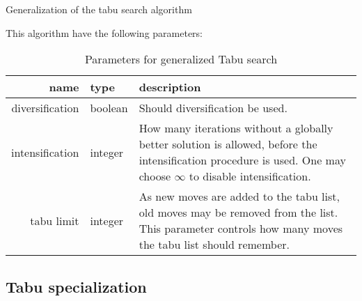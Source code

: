 \begin{algorithm}[H]
  \caption{Generalization of the tabu search algorithm}
  \begin{algorithmic}[1]
     
     
     
    \State
    \Repeat
         
            \State {}
        \Else
                 
            \EndIf
             
        \EndIf
        
        \EndIf
    \State {}
    \EndFunction
  \end{algorithmic}
\end{algorithm}

This algorithm have the following parameters:

\begin{table}[H]
\centering
\begin{tabular}{r|p{2cm}|p{6cm}}
	name & type & description \\ \hline
	diversification & boolean & Should diversification be used. \\
	intensification & integer & How many iterations without a globally better solution is allowed, before the intensification procedure is used. One may choose $\infty$ to disable intensification. \\
	tabu limit & integer & As new moves are added to the tabu list, old moves may be removed from the list. This parameter controls how many moves the tabu list should remember.
\end{tabular}
\caption{Parameters for generalized Tabu search}
\end{table}

\subsection{Tabu specialization}

